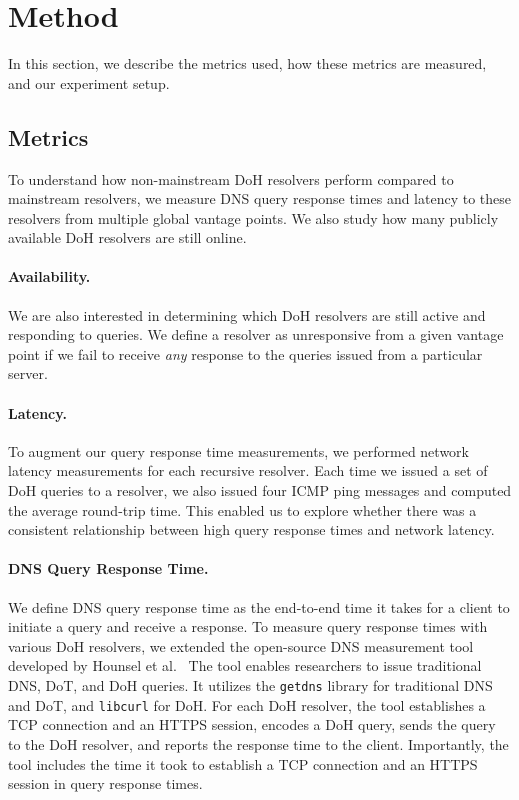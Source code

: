 \section{Method}\label{sec:method} In this section, we describe the metrics
used, how these metrics are measured, and our experiment setup.

\subsection{Metrics} To understand how non-mainstream DoH resolvers perform
compared to mainstream resolvers, we measure DNS query response times and
latency to these resolvers from multiple global vantage points.  We also study
how many publicly available DoH resolvers are still online.

\paragraph{Availability.} We are also interested in determining which DoH
resolvers are still active and responding to queries.  We define a resolver as
unresponsive from a given vantage point if we fail to receive \emph{any}
response to the queries issued from a particular server.

\paragraph{Latency.} To augment our query response time measurements, we
performed network latency measurements for each recursive resolver.  Each time
we issued a set of DoH queries to a resolver, we also issued four ICMP ping
messages and computed the average round-trip time.  This enabled us to explore
whether there was a consistent relationship between high query response times
and network latency.


\paragraph{DNS Query Response Time.} We define DNS query response time as the
end-to-end time it takes for a client to initiate a query and receive a
response.  To measure query response times with various DoH resolvers, we
extended the open-source DNS measurement tool developed by Hounsel et
al.~\cite{hounsel2020comparing} The tool enables researchers to issue
traditional DNS, DoT, and DoH queries.  It utilizes the \texttt{getdns}
library for traditional DNS and DoT, and \texttt{libcurl} for DoH.  For each
DoH resolver, the tool establishes a TCP connection and an HTTPS session,
encodes a DoH query, sends the query to the DoH resolver, and reports the
response time to the client.  Importantly, the tool includes the time it took
to establish a TCP connection and an HTTPS session in query response times.

